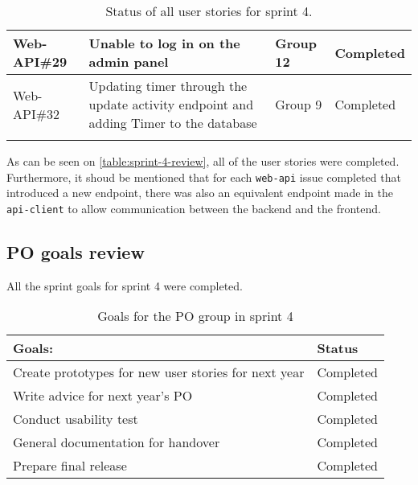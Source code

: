 \begin{longtable}{|p{2.9cm}|p{8cm}|p{2cm}|p{2cm}|}
    Web-API\#29 & Unable to log in on the admin panel                                                                                                                                                       & Group 12     & Completed    \\ \hline
    Web-API\#32 & Updating timer through the update activity endpoint and adding Timer to the database                                                                                                                                                       & Group 9     & Completed    \\ \hline
    \caption{Status of all user stories for sprint 4.}\label{table:sprint-4-review}
\end{longtable}
\noindent
As can be seen on \autoref{table:sprint-4-review}, all of the user stories were completed. Furthermore, it shoud be mentioned that for each \texttt{web-api} issue completed that introduced a new endpoint, there was also an equivalent endpoint made in the \texttt{api-client} to allow communication between the backend and the frontend.

\subsection{PO goals review}
All the sprint goals for sprint 4 were completed.
\begin{table}[H]
    \centering
    \begin{tabular}{|l|l|}
    \hline
    Goals:  & Status \\ \hline
     Create prototypes for new user stories for next year & Completed\\ \hline
     Write advice for next year's PO  & Completed  \\ \hline
     Conduct usability test & Completed  \\ \hline
     General documentation for handover & Completed \\ \hline
     Prepare final release & Completed  \\ \hline
    \end{tabular}
    \caption{Goals for the PO group in sprint 4}
\end{table}

